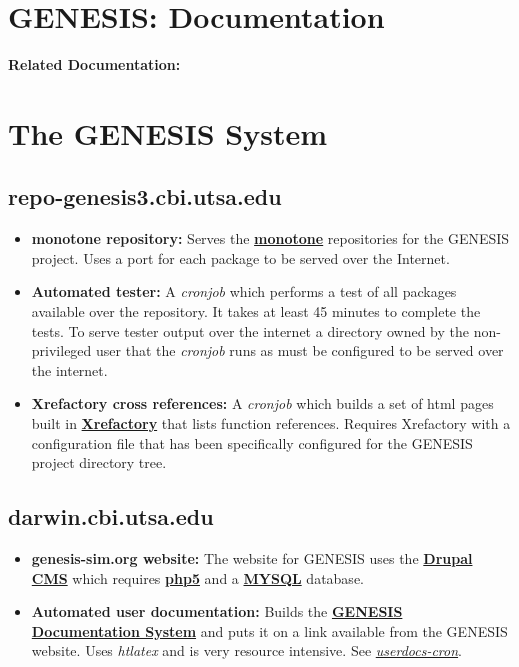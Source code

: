 \documentclass[12pt]{article}
\begin{document}
\section*{GENESIS: Documentation}

{\bf Related Documentation:}

\section*{The GENESIS System}

\subsection*{\bf repo-genesis3.cbi.utsa.edu}

\begin{itemize}

\item {\bf monotone repository:} Serves the \href{http://www.monotone.ca/}{\bf monotone} repositories for the GENESIS project. Uses a port for each package to be served over the Internet.

\item {\bf Automated tester:} A {\it cronjob} which performs a test of all packages available over the repository.  It takes at least 45 minutes to complete the tests. To serve tester output over the internet a directory owned by the non-privileged user that the {\it cronjob} runs as must be configured to be served over the internet.

\item {\bf Xrefactory cross references:} A {\it cronjob} which builds a set of html pages built in \href{http://www.xref-tech.com/xrefactory/main.html}{\bf Xrefactory} that lists function references.  Requires Xrefactory with a configuration file that has been specifically configured for the GENESIS project directory tree. 

\end{itemize}

\subsection*{\bf darwin.cbi.utsa.edu}

\begin{itemize}

\item {\bf genesis-sim.org website:} The website for GENESIS uses the \href{http://drupal.org/}{\bf Drupal CMS} which requires \href{http://www.php.net/}{\bf php5} and a \href{http://www.mysql.com/}{\bf MYSQL} database.

\item {\bf Automated user documentation:} Builds the \href{../documentation-overview/documentation-overview.tex}{\bf GENESIS Documentation System} and puts it on a link available from the GENESIS website.  Uses {\it htlatex} and is very resource intensive.  See \href{../userdocs-cron/userdocs-cron.tex}{\it userdocs-cron}.

\end{itemize}
\end{document}
